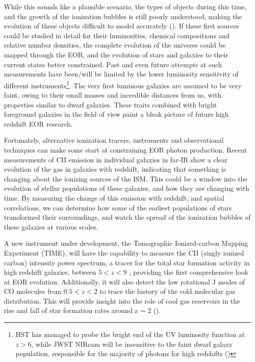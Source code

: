 \documentclass[manuscript]{aastex}
\begin{document}
While this sounds like a plausible scenario, the types of objects during this time, and the growth of the ionization bubbles is still poorly understood, making the evolution of these objects difficult to model accurately (\cite{Zaroubi2012}). If these first sources could be studied in detail for their luminosities, chemical compositions and relative number densities, the complete evolution of the universe could be mapped through the EOR, and the evolution of stars and galaxies to their current states better constrained. Past and even future attempts at such measurements have been/will be limited by the lower luminosity sensitivity of different instruments\footnote{HST has managed to probe the bright end of the UV luminosity function at \(z > 6\), while JWST NIRcam will be insensitive to the faint dwarf galaxy population, responsible for the majority of photons for high redshifts (\cite{Staniszewski2014})}. The very first luminous galaxies are assumed to be very faint, owing to their small masses and incredible distances from us, with properties similar to dwarf galaxies. These traits combined with bright foreground galaxies in the field of view paint a bleak picture of future high redshift EOR research. 

Fortunately, alternative ionization tracers, instruments and observational techniques can make some start at constraining EOR photon production. Recent measurements of CII emission in individual galaxies in far-IR show a clear evolution of the gas in galaxies with redshift, indicating that something is changing about the ionizing sources of the ISM. This could be a window into the evolution of stellar populations of these galaxies, and how they are changing with time. By measuring the change of this emission with redshift, and spatial correlations, we can determine how some of the earliest populations of stars transformed their surroundings, and watch the spread of the ionization bubbles of these galaxies at various scales. 

A new instrument under development, the Tomographic Ionized-carbon Mapping Experiment (TIME), will have the capability to measure the CII (singly ionized carbon) intensity power spectrum, a tracer for the total star formation activity in high redshift galaxies, between \(5 < z < 9\) , providing the first comprehensive look at EOR evolution. Additionally, it will also detect the low rotational J modes of CO molecules from \(0.5 < z < 2\) to trace the history of the cold molecular gas distribution. This will provide insight into the role of cool gas reservoirs in the rise and fall of star formation rates around z = 2 (\cite{Madau2014}).
\end{document}
